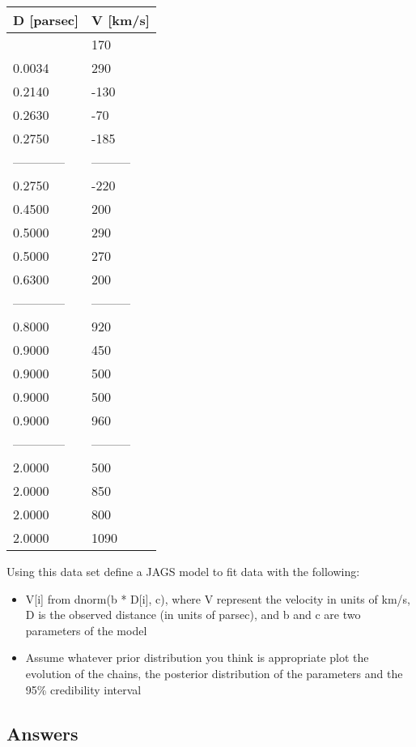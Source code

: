 \documentclass[
]{article}
\begin{document}
\begin{longtable}[]{@{}ll@{}}
\toprule\noalign{}
D {[}parsec{]} & V {[}km/s{]} \\
\midrule\noalign{}
\endhead
\bottomrule\noalign{}
\endlastfoot
0.0032 & 170 \\
0.0034 & 290 \\
0.2140 & -130 \\
0.2630 & -70 \\
0.2750 & -185 \\
------------ & --------- \\
0.2750 & -220 \\
0.4500 & 200 \\
0.5000 & 290 \\
0.5000 & 270 \\
0.6300 & 200 \\
------------ & --------- \\
0.8000 & 920 \\
0.9000 & 450 \\
0.9000 & 500 \\
0.9000 & 500 \\
0.9000 & 960 \\
------------ & --------- \\
2.0000 & 500 \\
2.0000 & 850 \\
2.0000 & 800 \\
2.0000 & 1090 \\
\end{longtable}

Using this data set define a JAGS model to fit data with the following:

\begin{itemize}
\item
  V{[}i{]} from dnorm(b * D{[}i{]}, c), where V represent the velocity
  in units of km/s, D is the observed distance (in units of parsec), and
  b and c are two parameters of the model
\item
  Assume whatever prior distribution you think is appropriate plot the
  evolution of the chains, the posterior distribution of the parameters
  and the 95\% credibility interval
\end{itemize}

\hypertarget{answers-3}{%
\subsection{Answers}\label{answers-3}}
\end{document}
